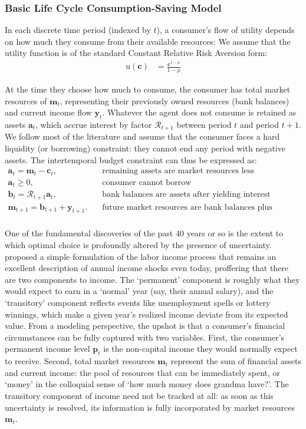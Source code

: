 \documentclass{article}
\newcommand{\CRRA}{\rho}
\newcommand{\uFunc}{\mathrm{u}}
\newcommand{\cLvl}{\mathbf{c}}
\newcommand{\mLvl}{\mathbf{m}}
\newcommand{\yLvl}{\mathbf{y}}
\newcommand{\aLvl}{\mathbf{a}}
\newcommand{\Rport}{\mathcal{R}}
\newcommand{\bLvl}{\mathbf{b}}
\newcommand{\pLvl}{\mathbf{p}}
\begin{document}
\subsubsection{Basic Life Cycle Consumption-Saving Model}

In each discrete time period (indexed by $t$), a consumer's flow of utility depends on how much they consume from their available resources:
We assume that the utility function is of the standard Constant Relative Risk Aversion form:
\begin{align}
    \uFunc(\cLvl) & = \frac{\cLvl^{1-\CRRA}}{1-\CRRA}
\end{align}

At the time they choose how much to consume, the consumer has total market resources of $\mLvl_t$, representing their previously owned resources (bank balances) and current income flow $\yLvl_t$.
Whatever the agent does not consume is retained as assets $\aLvl_t$, which accrue interest by factor $\Rport_{t+1}$ between period $t$ and period $t+1$.
We follow most of the literature and assume that the consumer faces a hard liquidity (or borrowing) constraint: they cannot end any period with negative assets.
The intertemporal budget constraint can thus be expressed as:
\begin{align}
    \aLvl_t = \mLvl_t - \cLvl_t, & \text{~~~remaining assets are market resources less consumption} \\
    \aLvl_t \geq 0, & \text{~~~consumer cannot borrow} \\
    \bLvl_t = \Rport_{t+1} \aLvl_t, & \text{~~~bank balances are assets after yielding interest} \\
    \mLvl_{t+1} = \bLvl_{t+1} + \yLvl_{t+1}. & \text{~~~future market resources are bank balances plus income} \\
\end{align}

One of the fundamental discoveries of the past 40 years or so is the extent to which optimal choice is profoundly altered by the presence of uncertainty.
\cite{friedman1957} proposed a simple formulation of the labor income process that remains an excellent description of annual income shocks even today, proffering that there are two components to income.
The `permanent' component is roughly what they would expect to earn in a `normal' year (say, their annual salary), and the `transitory' component reflects events like unemployment spells or lottery winnings, which make a given year's realized income deviate from its expected value.
From a modeling perspective, the upshot is that a consumer's financial circumstances can be fully captured with two variables.
First, the consumer's permanent income level $\pLvl_{t}$ is the non-capital income they would normally expect to receive.
Second, total market resources $\mLvl_{t}$ represent the sum of financial assets and current income: the pool of resources that can be immediately spent, or `money' in the colloquial sense of `how much money does grandma have?'.
The transitory component of income need not be tracked at all: as soon as this uncertainty is resolved, its information is fully incorporated by market resources $\mLvl_{t}$.
\end{document}
